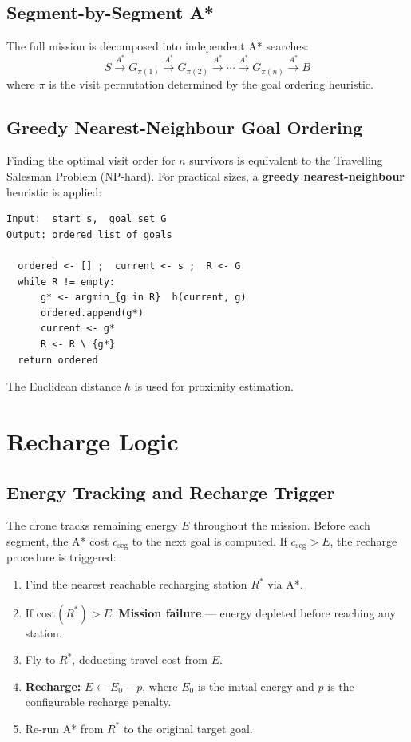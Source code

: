\documentclass[12pt]{article}
\begin{document}
\subsection{Segment-by-Segment A*}

The full mission is decomposed into independent A* searches:
\[
S \xrightarrow{A^*} G_{\pi(1)} \xrightarrow{A^*} G_{\pi(2)} \xrightarrow{A^*}
\cdots \xrightarrow{A^*} G_{\pi(n)} \xrightarrow{A^*} B
\]
where $\pi$ is the visit permutation determined by the goal ordering heuristic.

\subsection{Greedy Nearest-Neighbour Goal Ordering}

Finding the optimal visit order for $n$ survivors is equivalent to the
Travelling Salesman Problem (NP-hard).  For practical sizes, a
\textbf{greedy nearest-neighbour} heuristic is applied:

\begin{lstlisting}[language={}, caption={Greedy Nearest-Neighbour Goal Ordering (pseudocode)}]
Input:  start s,  goal set G
Output: ordered list of goals

  ordered <- [] ;  current <- s ;  R <- G
  while R != empty:
      g* <- argmin_{g in R}  h(current, g)
      ordered.append(g*)
      current <- g*
      R <- R \ {g*}
  return ordered
\end{lstlisting}

The Euclidean distance $h$ is used for proximity estimation.

\section{Recharge Logic}

\subsection{Energy Tracking and Recharge Trigger}

The drone tracks remaining energy $E$ throughout the mission.
Before each segment, the A* cost $c_{\text{seg}}$ to the next goal is computed.
If $c_{\text{seg}} > E$, the recharge procedure is triggered:

\begin{enumerate}
    \item Find the nearest reachable recharging station $R^*$ via A*.
    \item If $\text{cost}(R^*) > E$: \textbf{Mission failure} — energy depleted
          before reaching any station.
    \item Fly to $R^*$, deducting travel cost from $E$.
    \item \textbf{Recharge:} $E \gets E_0 - p$, where $E_0$ is the initial energy
          and $p$ is the configurable recharge penalty.
    \item Re-run A* from $R^*$ to the original target goal.
\end{enumerate}
\end{document}
